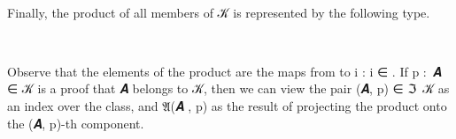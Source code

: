\documentclass[a4paper,UKenglish,cleveref,autoref,thm-restate]{lipics-v2021}
\begin{document}
\begin{code}
\>[1]\AgdaSpace{}%
\AgdaSymbol{:}\AgdaSpace{}%
\AgdaSymbol{\{}\AgdaSpace{}%
\AgdaSymbol{:}\AgdaSpace{}%
\AgdaSymbol{\}\{}\AgdaSpace{}%
\AgdaSymbol{:}\AgdaSpace{}%
\AgdaSpace{}%
\AgdaSymbol{(}\AgdaSpace{}%
\AgdaSpace{}%
\AgdaSymbol{)(}\AgdaSpace{}%
\AgdaSymbol{)\}}\AgdaSpace{}%
\AgdaSpace{}%
\AgdaSpace{}%
\AgdaSpace{}%
\AgdaSpace{}%
\AgdaSpace{}%
\AgdaSpace{}%
\<%
\\
%
\>[1]\AgdaSymbol{\{}\AgdaSymbol{\}\{}\AgdaSymbol{\}}\AgdaSpace{}%
\AgdaSymbol{=}\AgdaSpace{}%
\AgdaSpace{}%
\AgdaSymbol{(}\AgdaSpace{}%
\AgdaSymbol{:}\AgdaSpace{}%
\AgdaSymbol{(}\AgdaSpace{}%
\AgdaSymbol{))}\AgdaSpace{}%
\AgdaSpace{}%
\AgdaSpace{}%
\AgdaSpace{}%
\<%
\end{code}
\ccpad
Finally, the product of all members of 𝒦 is represented by the following type.
\ccpad
\begin{code}
\>[1]\AgdaSpace{}%
\AgdaSymbol{:}\AgdaSpace{}%
\AgdaSymbol{\{}\AgdaSpace{}%
\AgdaSymbol{:}\AgdaSpace{}%
\AgdaSymbol{\}}\AgdaSpace{}%
\AgdaSpace{}%
\AgdaSpace{}%
\AgdaSymbol{(}\AgdaSpace{}%
\AgdaSpace{}%
\AgdaSymbol{)(}\AgdaSpace{}%
\AgdaSymbol{)}\AgdaSpace{}%
\AgdaSpace{}%
\AgdaSpace{}%
\AgdaSymbol{(}\AgdaSpace{}%
\AgdaSymbol{)}\AgdaSpace{}%
\<%
\\
%
\>[1]\AgdaSpace{}%
\AgdaSymbol{\{}\AgdaSymbol{\}}\AgdaSpace{}%
\AgdaSpace{}%
\AgdaSymbol{=}\AgdaSpace{}%
\AgdaSpace{}%
\AgdaSymbol{(}\AgdaSpace{}%
\AgdaSymbol{\{}\AgdaSymbol{\}\{}\AgdaSymbol{\}}\AgdaSpace{}%
\AgdaSymbol{)}\<%
\end{code}
\ccpad
Observe that the elements of the product are the maps from  to \as{\{} \ab i \as : \ab i \as ∈ \as{\}}. If \ab p \as :~\ab 𝑨 \as ∈ \ab 𝒦 is a proof that \ab 𝑨 belongs to \ab 𝒦, then we can view the pair (\ab 𝑨, \ab p) \as ∈ \af ℑ\ \ab 𝒦 as an index over the class, and \af 𝔄(\ab 𝑨 , \ab p) as the result of projecting the product %
onto the (\ab 𝑨, \ab p)-th component.
\end{document}
